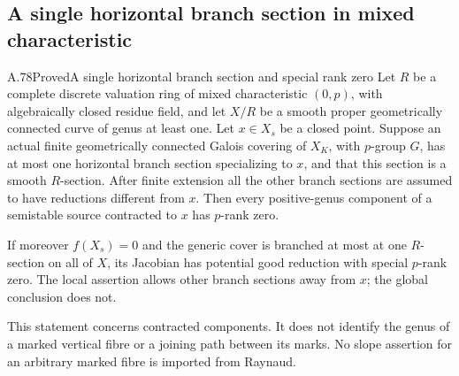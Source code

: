\subsection{A single horizontal branch section in mixed characteristic}

\begin{statement}{A.78}{Proved}{A single horizontal branch section and special rank zero}
Let \(R\) be a complete discrete valuation ring of mixed
characteristic \((0,p)\), with algebraically closed residue field,
and let \(X/R\) be a smooth proper geometrically connected curve
of genus at least one. Let \(x\in X_s\) be a closed point.
Suppose an actual finite geometrically connected Galois covering of \(X_K\), with
\(p\)-group \(G\), has at most one horizontal branch section
specializing to \(x\), and that this section is a smooth
\(R\)-section. After finite extension all the other branch
sections are assumed to have reductions different from \(x\).
Then every positive-genus component of a semistable source
contracted to \(x\) has \(p\)-rank zero.

If moreover \(f(X_s)=0\) and the generic cover is branched
at most at one \(R\)-section on all of \(X\), its
Jacobian has potential good reduction with special
\(p\)-rank zero. The local assertion allows other branch
sections away from \(x\); the global conclusion does not.
\end{statement}

This statement concerns contracted components. It does not
identify the genus of a marked vertical fibre or a joining
path between its marks. No slope assertion for an arbitrary
marked fibre is imported from Raynaud.

